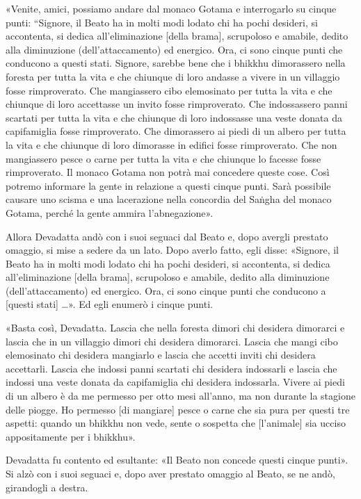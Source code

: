 «Venite, amici, possiamo andare dal monaco Gotama e interrogarlo su cinque
punti: “Signore, il Beato ha in molti modi lodato chi ha pochi desideri, si
accontenta, si dedica all’eliminazione [della brama], scrupoloso e amabile,
dedito alla diminuzione (dell’attaccamento) ed energico. Ora, ci sono cinque
punti che conducono a questi stati. Signore, sarebbe bene che i bhikkhu
dimorassero nella foresta per tutta la vita e che chiunque di loro andasse a
vivere in un villaggio fosse rimproverato. Che mangiassero cibo elemosinato per
tutta la vita e che chiunque di loro accettasse un invito fosse rimproverato.
Che indossassero panni scartati per tutta la vita e che chiunque di loro
indossasse una veste donata da capifamiglia fosse rimproverato. Che dimorassero
ai piedi di un albero per tutta la vita e che chiunque di loro dimorasse in
edifici fosse rimproverato. Che non mangiassero pesce o carne per tutta la vita
e che chiunque lo facesse fosse rimproverato. Il monaco Gotama non potrà mai
concedere queste cose. Così potremo informare la gente in relazione a questi
cinque punti. Sarà possibile causare uno scisma e una lacerazione nella
concordia del Saṅgha del monaco Gotama, perché la gente ammira l’abnegazione».

Allora Devadatta andò con i suoi seguaci dal Beato e, dopo avergli prestato
omaggio, si mise a sedere da un lato. Dopo averlo fatto, egli disse: «Signore,
il Beato ha in molti modi lodato chi ha pochi desideri, si accontenta, si dedica
all’eliminazione [della brama], scrupoloso e amabile, dedito alla diminuzione
(dell’attaccamento) ed energico. Ora, ci sono cinque punti che conducono a
[questi stati] …». Ed egli enumerò i cinque punti.

«Basta così, Devadatta. Lascia che nella foresta dimori chi desidera dimorarci e
lascia che in un villaggio dimori chi desidera dimorarci. Lascia che mangi cibo
elemosinato chi desidera mangiarlo e lascia che accetti inviti chi desidera
accettarli. Lascia che indossi panni scartati chi desidera indossarli e lascia
che indossi una veste donata da capifamiglia chi desidera indossarla. Vivere ai
piedi di un albero è da me permesso per otto mesi all’anno, ma non durante la
stagione delle piogge. \label{pag298}Ho permesso [di mangiare] pesce o carne che
sia pura per questi tre aspetti: quando un bhikkhu non vede, sente o sospetta
che [l’animale] sia ucciso appositamente per i bhikkhu».

Devadatta fu contento ed esultante: «Il Beato non concede questi cinque punti».
Si alzò con i suoi seguaci e, dopo aver prestato omaggio al Beato, se ne andò,
girandogli a destra.

